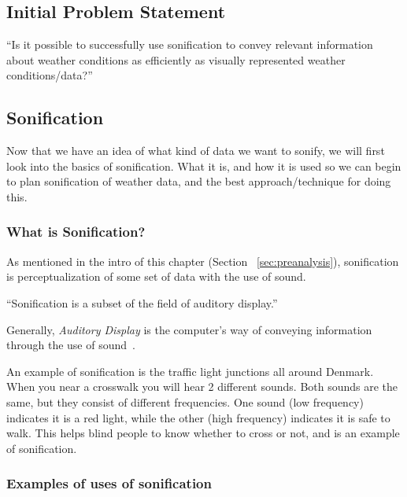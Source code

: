 \subsection{Initial Problem Statement} %
\label{sub:initial_problem_statement}

\enquote{Is it possible to successfully use sonification to convey relevant information about weather conditions as efficiently as visually represented weather conditions/data?}



\subsection{Sonification} %
\label{sub:sonification}

Now that we have an idea of what kind of data we want to sonify, we will first look into the basics of sonification. What it is, and how it is used so we can begin to plan sonification of weather data, and the best approach/technique for doing this.


\subsubsection{What is Sonification?} %
\label{ssub:what_is_sonification_}


As mentioned in the intro of this chapter (Section ~\ref{sec:preanalysis}), sonification is perceptualization of some set of data with the use of sound. 

\enquote{Sonification is a subset of the field of auditory display.}~\cite*{Walker2006}

Generally, \emph{Auditory Display} is the computer’s way of conveying information through the use of sound~\cite*{Wiki2014-3}.

An example of sonification is the traffic light junctions all around Denmark. 
When you near a crosswalk you will hear 2 different sounds. 
Both sounds are the same, but they consist of different frequencies. 
One sound (low frequency) indicates it is a red light, while the other (high frequency) indicates it is safe to walk. 
This helps blind people to know whether to cross or not, and is an example of sonification.





\subsubsection{Examples of uses of sonification} %
\label{ssub:examples_of_sonification}

